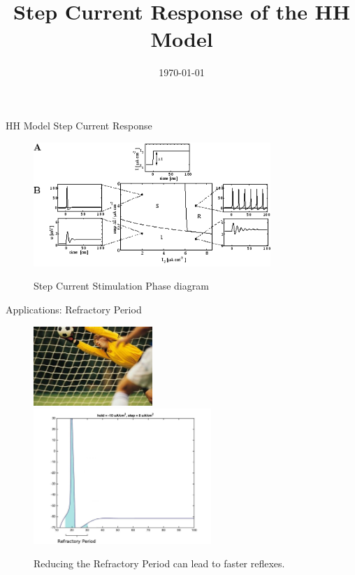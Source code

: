 \documentclass{beamer}
\title[A Constant Current Applied to the HH Model Produces a Train of Action Potentials.]{Step Current Response of the HH Model}
\author[E.Ioannidis \& J.Hobin] {\
   \texorpdfstring{\
        \begin{columns}
            \column{.45\linewidth}
            \centering
            Eleftherios Ioannidis\\
            \href{mailto:elefthei@mit.edu}{elefthei@mit.edu}
            \column{.45\linewidth}
            \centering
            James Hobin\\
            \href{mailto:hobinjk@mit.edu}{hobinjk@mit.edu}
        \end{columns}
   }
   {Eleftherios Ioannidis \& James Hobin}
}
\institute{MIT EECS}
\date{\today}
\begin{document}
\begin{frame}
  \titlepage{}
\end{frame}

\begin{frame}{HH Model Step Current Response}
  \begin{figure}
    \centering
    \includegraphics[width = 0.8\textwidth]{./pictures/gerstner.png}

    Step Current Stimulation Phase diagram
  \end{figure}
\end{frame}

\begin{frame}{Applications: Refractory Period}
  \begin{figure}
    \centering
    \includegraphics[width = 0.4\textwidth]{./pictures/reflexes.jpg}
    \includegraphics[width = 0.6\textwidth]{./pictures/refractory.jpg}

    Reducing the Refractory Period can lead to faster reflexes.
  \end{figure}
\end{frame}
\end{document}
